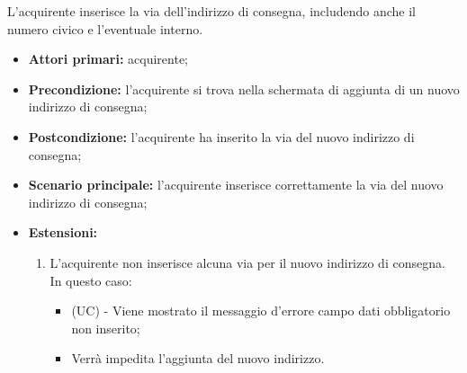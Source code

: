 L'acquirente inserisce la via dell'indirizzo di consegna, includendo anche il numero civico e l'eventuale interno.
\begin{itemize}
    \item \textbf{Attori primari:} acquirente;
    \item \textbf{Precondizione:} l'acquirente si trova nella schermata di aggiunta di un nuovo indirizzo di consegna;
    \item \textbf{Postcondizione:} l'acquirente ha inserito la via del nuovo indirizzo di consegna;
    \item \textbf{Scenario principale:} l'acquirente inserisce correttamente la via del nuovo indirizzo di consegna;
    \item \textbf{Estensioni:}
    \begin{enumerate}[label=\lett]
        \item L'acquirente non inserisce alcuna via per il nuovo indirizzo di consegna. In questo caso:
        \begin{itemize}
            \item (UC) - Viene mostrato il messaggio d'errore campo dati obbligatorio non inserito;
            \item Verrà impedita l'aggiunta del nuovo indirizzo.
        \end{itemize}
    \end{enumerate}
\end{itemize}

